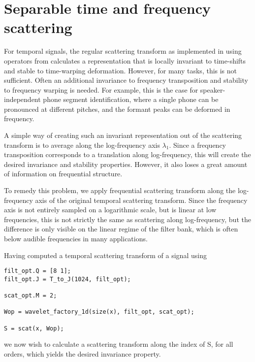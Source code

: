 \documentclass{article}
\begin{document}
\section{Separable time and frequency scattering}
\label{sec:separable-tf}

For temporal signals, the regular scattering transform as implemented in  using operators  from  calculates a representation that is locally invariant to time-shifts and stable to time-warping deformation. However, for many tasks, this is not sufficient. Often an additional invariance to frequency transposition and stability to frequency warping is needed. For example, this is the case for speaker-independent phone segment identification, where a single phone can be pronounced at different pitches, and the formant peaks can be deformed in frequency.

A simple way of creating such an invariant representation out of the scattering transform is to average along the log-frequency axis $\lambda_1$. Since a frequency transposition corresponds to a translation along log-frequency, this will create the desired invariance and stability properties. However, it also loses a great amount of information on frequential structure.

To remedy this problem, we apply frequential scattering transform along the log-frequency axis of the original temporal scattering transform. Since the frequency axis is not entirely sampled on a logarithmic scale, but is linear at low frequencies, this is not strictly the same as scattering along log-frequency, but the difference is only visible on the linear regime of the filter bank, which is often below audible frequencies in many applications.

Having computed a temporal scattering transform of a signal  using
\begin{lstlisting}
filt_opt.Q = [8 1];
filt_opt.J = T_to_J(1024, filt_opt);

scat_opt.M = 2;

Wop = wavelet_factory_1d(size(x), filt_opt, scat_opt);

S = scat(x, Wop);
\end{lstlisting}
we now wish to calculate a scattering transform along the  index of S, for all orders, which yields the desired invariance property.
\end{document}
